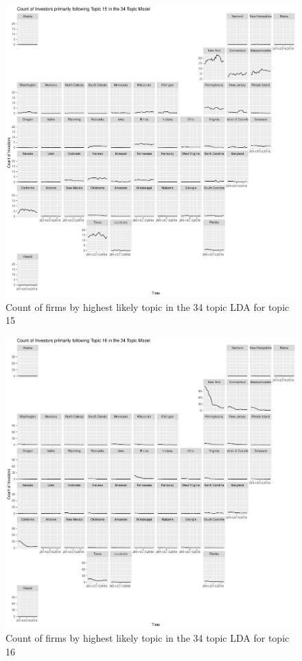 		\begin{figure}
		\centering
		\includegraphics[width=1\linewidth]{Figures/ChapterV/USA_34_Topic15.pdf}
		\caption[Count of Firms for Topic 15 by Quarter]{Count of firms by highest likely topic in the 34 topic LDA for topic 15}
		\label{fig:StateLDA15}
	\end{figure}
	
		\begin{figure}
		\centering
		\includegraphics[width=1\linewidth]{Figures/ChapterV/USA_34_Topic16.pdf}
		\caption[Count of Firms for Topic 16 by Quarter]{Count of firms by highest likely topic in the 34 topic LDA for topic 16}
		\label{fig:StateLDA16}
	\end{figure}
	
